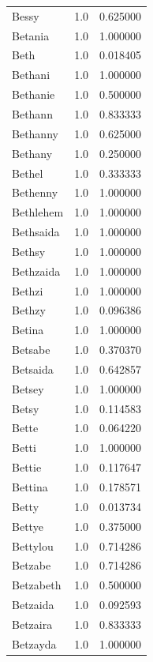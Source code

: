\documentclass[
  letterpaper,
  DIV=11,
  numbers=noendperiod]{scrreprt}
\begin{document}
\begin{tabular}{lrr}
Bessy           &   1.0 &   0.625000 \\
Betania         &   1.0 &   1.000000 \\
Beth            &   1.0 &   0.018405 \\
Bethani         &   1.0 &   1.000000 \\
Bethanie        &   1.0 &   0.500000 \\
Bethann         &   1.0 &   0.833333 \\
Bethanny        &   1.0 &   0.625000 \\
Bethany         &   1.0 &   0.250000 \\
Bethel          &   1.0 &   0.333333 \\
Bethenny        &   1.0 &   1.000000 \\
Bethlehem       &   1.0 &   1.000000 \\
Bethsaida       &   1.0 &   1.000000 \\
Bethsy          &   1.0 &   1.000000 \\
Bethzaida       &   1.0 &   1.000000 \\
Bethzi          &   1.0 &   1.000000 \\
Bethzy          &   1.0 &   0.096386 \\
Betina          &   1.0 &   1.000000 \\
Betsabe         &   1.0 &   0.370370 \\
Betsaida        &   1.0 &   0.642857 \\
Betsey          &   1.0 &   1.000000 \\
Betsy           &   1.0 &   0.114583 \\
Bette           &   1.0 &   0.064220 \\
Betti           &   1.0 &   1.000000 \\
Bettie          &   1.0 &   0.117647 \\
Bettina         &   1.0 &   0.178571 \\
Betty           &   1.0 &   0.013734 \\
Bettye          &   1.0 &   0.375000 \\
Bettylou        &   1.0 &   0.714286 \\
Betzabe         &   1.0 &   0.714286 \\
Betzabeth       &   1.0 &   0.500000 \\
Betzaida        &   1.0 &   0.092593 \\
Betzaira        &   1.0 &   0.833333 \\
Betzayda        &   1.0 &   1.000000 \\

\end{tabular}
\end{document}

